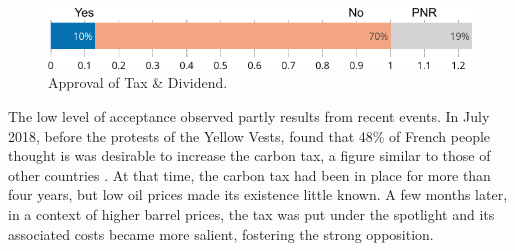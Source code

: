 \documentclass[english,5p,authoryear]{elsarticle}
\begin{document}

\begin{figure}[t]
\centering
\includegraphics[width=\columnwidth]{Images/approval_trim.png}
\caption{Approval of Tax \& Dividend.}
\label{fig:approval}
\end{figure}


The low level of acceptance observed partly results from recent events. In July 2018, before the protests of the Yellow Vests, \citet{ademe_representations_2018} found that 48\% of French people thought is was desirable to increase the carbon tax, a figure similar to those of other countries \citep{brechin_public_2010}. At that time, the carbon tax had been in place for more than four years, but low oil prices made its existence little known. A few months later, in a context of higher barrel prices, the tax was put under the spotlight and its associated costs became more salient, fostering the strong opposition.

\end{document}

